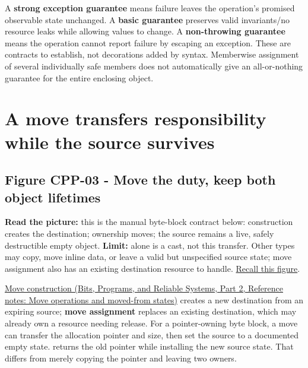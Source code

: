 A \textbf{strong exception guarantee} means failure leaves the operation's promised observable state unchanged. A \textbf{basic guarantee} preserves valid invariants/no resource leaks while allowing values to change. A \textbf{non-throwing guarantee} means the operation cannot report failure by escaping an exception. These are contracts to establish, not decorations added by syntax. Memberwise assignment of several individually safe members does not automatically give an all-or-nothing guarantee for the entire enclosing object.

\section{A move transfers responsibility while the source survives}\label{05-engine-i-ch003-a-move-transfers-responsibility-while-the-source-survives}

\hypertarget{05-engine-i-ch003-a-move-transfers-responsibility-while-the-source-survives}{}

\subsection{Figure CPP-03 - Move the duty, keep both object lifetimes}\label{05-engine-i-ch003-figure-cpp-03---move-the-duty-keep-both-object-lifetimes}

\hypertarget{05-engine-i-ch003-figure-cpp-03---move-the-duty-keep-both-object-lifetimes}{}


\textbf{Read the picture:} this is the manual byte-block contract below: construction creates the destination; ownership moves; the source remains a live, safely destructible empty object. \textbf{Limit:}  alone is a cast, not this transfer. Other types may copy, move inline data, or leave a valid but unspecified source state; move assignment also has an existing destination resource to handle. \hyperref[appendix-960160274237-four-figure-briefs]{Recall this figure}.

\href{../01-Bits-Programs-and-Reliable-Systems-P02/main.pdf\#nameddest=appendix-5636651017c2}{Move construction (Bits, Programs, and Reliable Systems, Part 2, Reference notes: Move operations and moved-from states)} creates a new destination from an expiring source; \textbf{move assignment} replaces an existing destination, which may already own a resource needing release. For a pointer-owning byte block, a move can transfer the allocation pointer and size, then set the source to a documented empty state.  returns the old pointer while installing the new source state. That differs from merely copying the pointer and leaving two owners.

